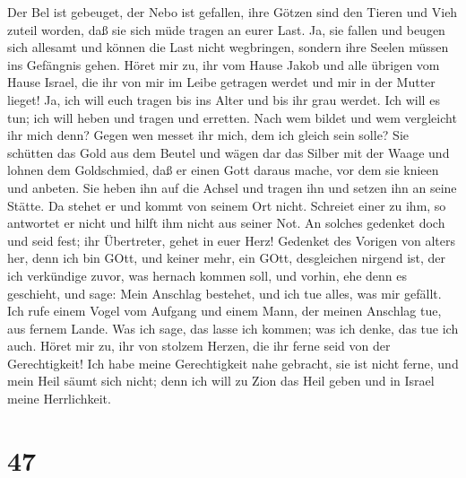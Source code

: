  Der Bel ist gebeuget, der Nebo ist gefallen, ihre Götzen
sind den Tieren und Vieh zuteil worden, daß sie sich müde tragen an
eurer Last.  Ja, sie fallen und beugen sich allesamt und
können die Last nicht wegbringen, sondern ihre Seelen müssen ins
Gefängnis gehen.  Höret mir zu, ihr vom Hause Jakob und alle
übrigen vom Hause Israel, die ihr von mir im Leibe getragen werdet und
mir in der Mutter lieget!  Ja, ich will euch tragen bis ins
Alter und bis ihr grau werdet. Ich will es tun; ich will heben und
tragen und erretten.  Nach wem bildet und wem vergleicht ihr
mich denn? Gegen wen messet ihr mich, dem ich gleich sein solle?
 Sie schütten das Gold aus dem Beutel und wägen dar das
Silber mit der Waage und lohnen dem Goldschmied, daß er einen Gott
daraus mache, vor dem sie knieen und anbeten.  Sie heben ihn
auf die Achsel und tragen ihn und setzen ihn an seine Stätte. Da stehet
er und kommt von seinem Ort nicht. Schreiet einer zu ihm, so antwortet
er nicht und hilft ihm nicht aus seiner Not.  An solches
gedenket doch und seid fest; ihr Übertreter, gehet in euer Herz!
 Gedenket des Vorigen von alters her, denn ich bin GOtt, und
keiner mehr, ein GOtt, desgleichen nirgend ist,  der ich
verkündige zuvor, was hernach kommen soll, und vorhin, ehe denn es
geschieht, und sage: Mein Anschlag bestehet, und ich tue alles, was mir
gefällt.  Ich rufe einem Vogel vom Aufgang und einem Mann,
der meinen Anschlag tue, aus fernem Lande. Was ich sage, das lasse ich
kommen; was ich denke, das tue ich auch.  Höret mir zu, ihr
von stolzem Herzen, die ihr ferne seid von der Gerechtigkeit!
 Ich habe meine Gerechtigkeit nahe gebracht, sie ist nicht
ferne, und mein Heil säumt sich nicht; denn ich will zu Zion das Heil
geben und in Israel meine Herrlichkeit.

\hypertarget{section-46}{%
\section{47}\label{section-46}}

